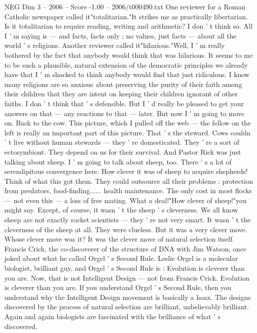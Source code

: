 \begin{textsample}{NEG Dim 3 – 2006 – Score -1.00 – 2006/t000490.txt}
One reviewer for a Roman Catholic newspaper called it"totalitarian."It strikes me as practically libertarian.
Is it totalitarian to require reading, writing and arithmetic?
I don ' t think so.
All I ' m saying is — and facts, facts only ; no values, just facts — about all the world ' s religions.
Another reviewer called it"hilarious."Well, I ' m really bothered by the fact that anybody would think that was hilarious.
It seems to me to be such a plausible, natural extension of the democratic principles we already have that I ' m shocked to think anybody would find that just ridiculous.
I know many religions are so anxious about preserving the purity of their faith among their children that they are intent on keeping their children ignorant of other faiths.
I don ' t think that ' s defensible.
But I ' d really be pleased to get your answers on that — any reactions to that — later.
But now I ' m going to move on.
Back to the cow.
This picture, which I pulled off the web — the fellow on the left is really an important part of this picture.
That ' s the steward.
Cows couldn ' t live without human stewards — they ' re domesticated.
They ' re a sort of ectosymbiont.
They depend on us for their survival.
And Pastor Rick was just talking about sheep.
I ' m going to talk about sheep, too.
There ' s a lot of serendipitous convergence here.
How clever it was of sheep to acquire shepherds!
Think of what this got them.
They could outsource all their problems : protection from predators, food-finding...... health maintenance.
The only cost in most flocks — not even this — a loss of free mating.
What a deal!"How clever of sheep!"you might say.
Except, of course, it wasn ' t the sheep ' s cleverness.
We all know sheep are not exactly rocket scientists — they ' re not very smart.
It wasn ' t the cleverness of the sheep at all.
They were clueless.
But it was a very clever move.
Whose clever move was it?
It was the clever move of natural selection itself.
Francis Crick, the co-discoverer of the structure of DNA with Jim Watson, once joked about what he called Orgel ' s Second Rule.
Leslie Orgel is a molecular biologist, brilliant guy, and Orgel ' s Second Rule is : Evolution is cleverer than you are.
Now, that is not Intelligent Design — not from Francis Crick.
Evolution is cleverer than you are.
If you understand Orgel ' s Second Rule, then you understand why the Intelligent Design movement is basically a hoax.
The designs discovered by the process of natural selection are brilliant, unbelievably brilliant.
Again and again biologists are fascinated with the brilliance of what ' s discovered.

\end{textsample}

